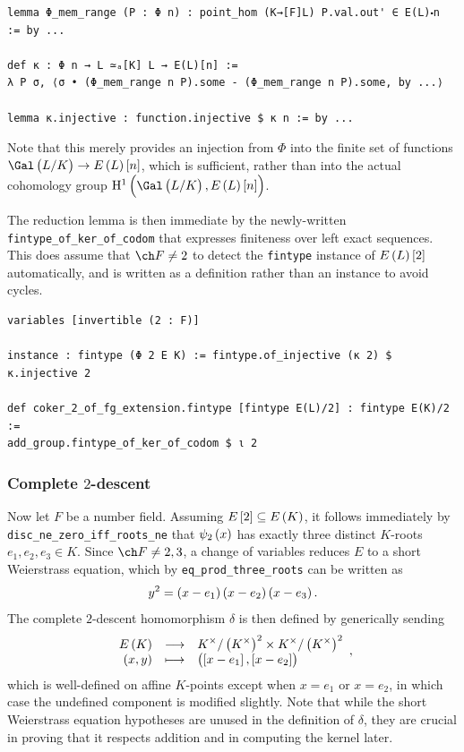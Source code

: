 \begin{lstlisting}[frame=single]
lemma Φ_mem_range (P : Φ n) : point_hom (K→[F]L) P.val.out' ∈ E(L)⬝n := by ...

def κ : Φ n → L ≃ₐ[K] L → E(L)[n] :=
λ P σ, ⟨σ • (Φ_mem_range n P).some - (Φ_mem_range n P).some, by ...⟩

lemma κ.injective : function.injective $ κ n := by ...
\end{lstlisting}

Note that this merely provides an injection from $ \Phi $ into the finite set of functions $ \Gal\br{L / K} \to E\br{L}\sbr{n} $, which is sufficient, rather than into the actual cohomology group $ \H^1\br{\Gal\br{L / K}, E\br{L}\sbr{n}} $.

The reduction lemma is then immediate by the newly-written \texttt{fintype\_of\_ker\_of\_codom} that expresses finiteness over left exact sequences. This does assume that $ \ch F \ne 2 $ to detect the \texttt{fintype} instance of $ E\br{L}\sbr{2} $ automatically, and is written as a definition rather than an instance to avoid cycles.

\begin{lstlisting}[frame=single]
variables [invertible (2 : F)]

instance : fintype (Φ 2 E K) := fintype.of_injective (κ 2) $ κ.injective 2

def coker_2_of_fg_extension.fintype [fintype E(L)/2] : fintype E(K)/2 :=
add_group.fintype_of_ker_of_codom $ ι 2
\end{lstlisting}

\pagebreak

\subsubsection{Complete \texorpdfstring{$ 2 $}{2}-descent}

Now let $ F $ be a number field. Assuming $ E\sbr{2} \subseteq E\br{K} $, it follows immediately by \texttt{disc\_ne\_zero\_iff\_roots\_ne} that $ \psi_2\br{x} $ has exactly three distinct $ K $-roots $ e_1, e_2, e_3 \in K $. Since $ \ch F \ne 2, 3 $, a change of variables reduces $ E $ to a short Weierstrass equation, which by \texttt{eq\_prod\_three\_roots} can be written as
$$ y^2 = \br{x - e_1}\br{x - e_2}\br{x - e_3}. $$
The complete $ 2 $-descent homomorphism $ \delta $ is then defined by generically sending
$$ \function{E\br{K}}{K^\times / \br{K^\times}^2 \times K^\times / \br{K^\times}^2}{\br{x, y}}{\br{\sbr{x - e_1}, \sbr{x - e_2}}}, $$
which is well-defined on affine $ K $-points except when $ x = e_1 $ or $ x = e_2 $, in which case the undefined component is modified slightly. Note that while the short Weierstrass equation hypotheses are unused in the definition of $ \delta $, they are crucial in proving that it respects addition and in computing the kernel later.

